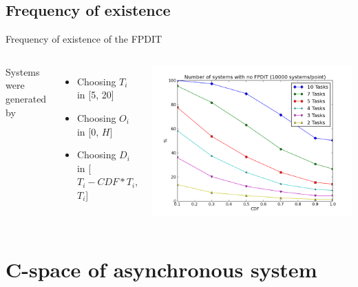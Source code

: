 \documentclass{beamer}
\begin{document}
    \subsection{Frequency of existence}

    \begin{frame}{Frequency of existence of the FPDIT}

    \begin{columns}[c]

        Systems were generated by
        \begin{itemize}
            \item Choosing $T_i$ in [5, 20]
            \item Choosing $O_i$ in [0, $H$]
            \item Choosing $D_i$ in [$T_i - CDF * T_i$, $T_i$]
        \end{itemize}

        \includegraphics[width=1.2\textwidth]{figs/nofpdit_5.png}

    \end{columns}

    \end{frame}

\section{C-space of asynchronous system}

    \begin{frame}
    \end{frame}
\end{document}
